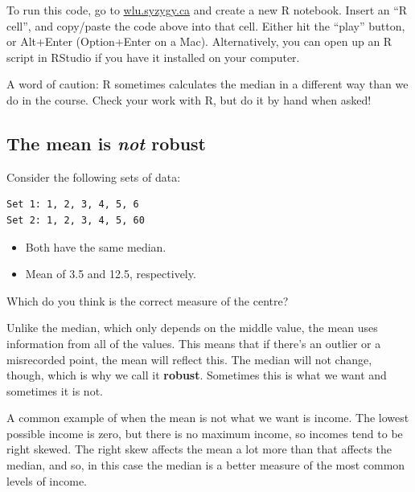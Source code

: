 \documentclass[
  letterpaper,
  DIV=11,
  numbers=noendperiod,
  oneside]{scrreprt}
\providecommand{\tightlist}{%
  \setlength{\itemsep}{0pt}\setlength{\parskip}{0pt}}\usepackage{longtable,booktabs,array}
\begin{document}
To run this code, go to \url{wlu.syzygy.ca} and create a new R notebook.
Insert an ``R cell'', and copy/paste the code above into that cell.
Either hit the ``play'' button, or Alt+Enter (Option+Enter on a Mac).
Alternatively, you can open up an R script in RStudio if you have it
installed on your computer.

A word of caution: R sometimes calculates the median in a different way
than we do in the course. Check your work with R, but do it by hand when
asked!

\hypertarget{the-mean-is-not-robust}{%
\subsection{\texorpdfstring{The mean is \emph{not}
robust}{The mean is not robust}}\label{the-mean-is-not-robust}}

Consider the following sets of data:

\begin{verbatim}
Set 1: 1, 2, 3, 4, 5, 6
Set 2: 1, 2, 3, 4, 5, 60
\end{verbatim}

\begin{itemize}
\tightlist
\item
  Both have the same median.
\item
  Mean of 3.5 and 12.5, respectively.
\end{itemize}

Which do you think is the correct measure of the centre?

Unlike the median, which only depends on the middle value, the mean uses
information from all of the values. This means that if there's an
outlier or a misrecorded point, the mean will reflect this. The median
will not change, though, which is why we call it \textbf{robust}.
Sometimes this is what we want and sometimes it is not.
{}

A common example of when the mean is not what we want is income. The
lowest possible income is zero, but there is no maximum income, so
incomes tend to be right skewed. The right skew affects the mean a lot
more than that affects the median, and so, in this case the median is a
better measure of the most common levels of income.
\end{document}
